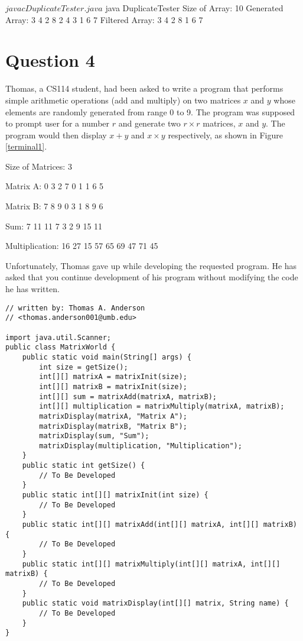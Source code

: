 \documentclass[12pt,letterpaper,twoside]{article}
\begin{document}
\begin{terminal}
$ javac DuplicateTester.java
$ java DuplicateTester
Size of Array: 10
Generated Array:
3 4 2 8 2 4 3 1 6 7
Filtered Array:
3 4 2 8 1 6 7
\end{terminal}

\newpage

\section*{Question 4}

Thomas, a CS114 student, had been asked to write a program that performs simple arithmetic operations (add and multiply) on two matrices $x$ and $y$ whose elements are randomly generated from range 0 to 9.
The program was supposed to prompt user for a number $r$ and generate two $r \times r$ matrices, $x$ and $y$.
The program would then display $x + y$ and $x \times y$ respectively, as shown in Figure \ref{terminal1}.

\renewcommand{\lstlistingname}{Figure}
\begin{terminal}
Size of Matrices: 3

Matrix A:
  0   3   2
  7   0   1
  1   6   5

Matrix B:
  7   8   9
  0   3   1
  8   9   6

Sum:
  7  11  11
  7   3   2
  9  15  11

Multiplication:
 16  27  15
 57  65  69
 47  71  45
\end{terminal}

\newpage

Unfortunately, Thomas gave up while developing the requested program.
He has asked that you continue development of his program without modifying the code he has written.

\lstset{caption=}
\lstset{language=Java,tabsize=4}
\begin{lstlisting}
// written by: Thomas A. Anderson
// <thomas.anderson001@umb.edu>

import java.util.Scanner;
public class MatrixWorld {
	public static void main(String[] args) {
		int size = getSize();
		int[][] matrixA = matrixInit(size);
		int[][] matrixB = matrixInit(size);
		int[][] sum = matrixAdd(matrixA, matrixB);
		int[][] multiplication = matrixMultiply(matrixA, matrixB);
		matrixDisplay(matrixA, "Matrix A");
		matrixDisplay(matrixB, "Matrix B");
		matrixDisplay(sum, "Sum");
		matrixDisplay(multiplication, "Multiplication");
	}
	public static int getSize() {
		// To Be Developed
	}
	public static int[][] matrixInit(int size) {
		// To Be Developed
	}
	public static int[][] matrixAdd(int[][] matrixA, int[][] matrixB) {
		// To Be Developed
	}
	public static int[][] matrixMultiply(int[][] matrixA, int[][] matrixB) {
		// To Be Developed
	}
	public static void matrixDisplay(int[][] matrix, String name) {
		// To Be Developed
	}
}
\end{lstlisting}
\end{document}
